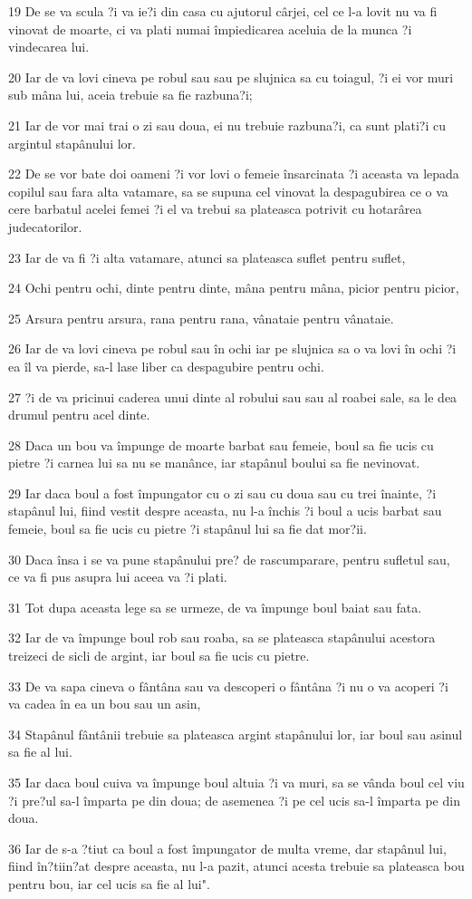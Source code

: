 \par 19 De se va scula ?i va ie?i din casa cu ajutorul cârjei, cel ce l-a lovit nu va fi vinovat de moarte, ci va plati numai împiedicarea aceluia de la munca ?i vindecarea lui.
\par 20 Iar de va lovi cineva pe robul sau sau pe slujnica sa cu toiagul, ?i ei vor muri sub mâna lui, aceia trebuie sa fie razbuna?i;
\par 21 Iar de vor mai trai o zi sau doua, ei nu trebuie razbuna?i, ca sunt plati?i cu argintul stapânului lor.
\par 22 De se vor bate doi oameni ?i vor lovi o femeie însarcinata ?i aceasta va lepada copilul sau fara alta vatamare, sa se supuna cel vinovat la despagubirea ce o va cere barbatul acelei femei ?i el va trebui sa plateasca potrivit cu hotarârea judecatorilor.
\par 23 Iar de va fi ?i alta vatamare, atunci sa plateasca suflet pentru suflet,
\par 24 Ochi pentru ochi, dinte pentru dinte, mâna pentru mâna, picior pentru picior,
\par 25 Arsura pentru arsura, rana pentru rana, vânataie pentru vânataie.
\par 26 Iar de va lovi cineva pe robul sau în ochi iar pe slujnica sa o va lovi în ochi ?i ea îl va pierde, sa-l lase liber ca despagubire pentru ochi.
\par 27 ?i de va pricinui caderea unui dinte al robului sau sau al roabei sale, sa le dea drumul pentru acel dinte.
\par 28 Daca un bou va împunge de moarte barbat sau femeie, boul sa fie ucis cu pietre ?i carnea lui sa nu se manânce, iar stapânul boului sa fie nevinovat.
\par 29 Iar daca boul a fost împungator cu o zi sau cu doua sau cu trei înainte, ?i stapânul lui, fiind vestit despre aceasta, nu l-a închis ?i boul a ucis barbat sau femeie, boul sa fie ucis cu pietre ?i stapânul lui sa fie dat mor?ii.
\par 30 Daca însa i se va pune stapânului pre? de rascumparare, pentru sufletul sau, ce va fi pus asupra lui aceea va ?i plati.
\par 31 Tot dupa aceasta lege sa se urmeze, de va împunge boul baiat sau fata.
\par 32 Iar de va împunge boul rob sau roaba, sa se plateasca stapânului acestora treizeci de sicli de argint, iar boul sa fie ucis cu pietre.
\par 33 De va sapa cineva o fântâna sau va descoperi o fântâna ?i nu o va acoperi ?i va cadea în ea un bou sau un asin,
\par 34 Stapânul fântânii trebuie sa plateasca argint stapânului lor, iar boul sau asinul sa fie al lui.
\par 35 Iar daca boul cuiva va împunge boul altuia ?i va muri, sa se vânda boul cel viu ?i pre?ul sa-l împarta pe din doua; de asemenea ?i pe cel ucis sa-l împarta pe din doua.
\par 36 Iar de s-a ?tiut ca boul a fost împungator de multa vreme, dar stapânul lui, fiind în?tiin?at despre aceasta, nu l-a pazit, atunci acesta trebuie sa plateasca bou pentru bou, iar cel ucis sa fie al lui".

